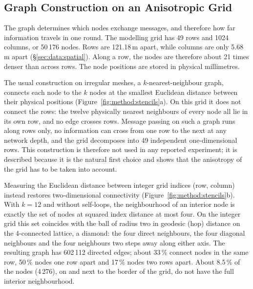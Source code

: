 \subsection{Graph Construction on an Anisotropic Grid}
\label{sec:method:graph}

The graph determines which nodes exchange messages, and therefore how far
information travels in one round. The modelling grid has 49 rows and 1024
columns, or 50\,176 nodes. Rows are 121.18\,\textmu{}m apart, while
columns are only 5.68\,\textmu{}m apart (\S\ref{sec:data:spatial}). Along a
row, the nodes are therefore about 21 times denser than across rows. The
node positions are stored in physical millimetres.

The usual construction on irregular meshes, a $k$-nearest-neighbour graph,
connects each node to the $k$ nodes at the smallest Euclidean distance
between their physical positions (Figure~\ref{fig:method:stencils}a). On
this grid it does not connect the rows: the twelve physically nearest
neighbours of every node all lie in its own row, and no edge crosses rows.
Message passing on such a graph runs along rows only, no information can
cross from one row to the next at any network depth, and the grid
decomposes into 49 independent one-dimensional rows. This construction is
therefore not used in any reported experiment; it is described because it
is the natural first choice and shows that the anisotropy of the grid has
to be taken into account.

Measuring the Euclidean distance between integer grid indices (row,
column) instead restores two-dimensional connectivity
(Figure~\ref{fig:method:stencils}b). With $k = 12$ and without
self-loops, the neighbourhood of an interior node is exactly the set of
nodes at squared index distance at most four. On the integer grid this set
coincides with the ball of radius two in geodesic (hop) distance on the
4-connected lattice, a diamond: the four direct neighbours, the four
diagonal neighbours and the four neighbours two steps away along either
axis. The resulting graph has
602\,112 directed edges; about 33\,\% connect nodes in the same row,
50\,\% nodes one row apart and 17\,\% nodes two rows apart. About 8.5\,\%
of the nodes (4\,276), on and next to the border of the grid, do not have
the full interior neighbourhood.

